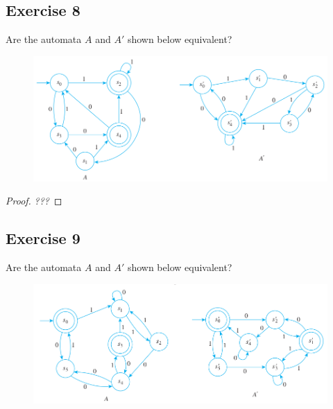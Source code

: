 \documentclass[14pt]{extarticle}
\begin{document}
\subsection{Exercise 8}
Are the automata \(A\) and \(A'\) shown below equivalent?

\begin{figure}[ht!]
\centering
\includegraphics[scale=0.5]{../images/12.3.8.png}
\end{figure}

\begin{proof}
{\it ???}
\end{proof}

\subsection{Exercise 9}
Are the automata \(A\) and \(A'\) shown below equivalent?

\begin{figure}[ht!]
\centering
\includegraphics[scale=0.5]{../images/12.3.9.png}
\end{figure}
\end{document}
